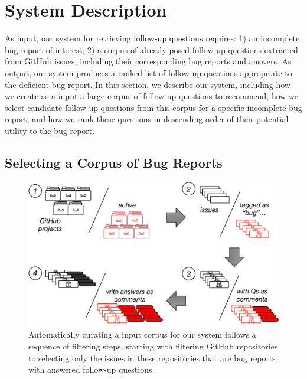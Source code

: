 \section{System Description}

As input, our system for retrieving follow-up questions requires: 1) an incomplete bug
report of interest; 2) a corpus of already posed follow-up questions extracted
from GitHub issues, including their corresponding bug reports and answers. As output, our system
produces a ranked list of follow-up questions appropriate to the deficient bug report.
In this section, we describe our system, including how we create as a input
a large corpus of follow-up questions to recommend, how we select candidate follow-up questions from
this corpus for a specific incomplete bug report, and how we rank these questions in descending order of
their potential utility to the bug report.

\subsection{Selecting a Corpus of Bug Reports}


\begin{figure}[ht]
\centering
\includegraphics[width=0.99\linewidth]{figures/pipeline.pdf}
\caption{Automatically curating a input corpus for our system follows a sequence of filtering steps, starting with filtering
GitHub repositories to selecting only the issues in these repositories that are bug reports with answered follow-up questions.}
\label{fig:pipeline}
\end{figure}

